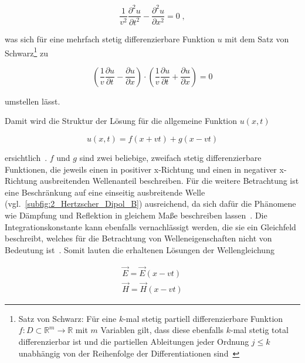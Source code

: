 \begin{equation}
    \frac{1}{v^2}\frac{\partial^2 u}{\partial t^2} - \frac{\partial^2 u}{\partial x^2} = 0 \; ,
\end{equation}

was sich für eine mehrfach stetig differenzierbare Funktion $u$ mit dem Satz von Schwarz\footnote{Satz von Schwarz: Für eine $k$-mal stetig partiell differenzierbare Funktion $f : D \subset \mathbb{R}^m \to \mathbb{R}$ mit $m$ Variablen gilt, dass diese ebenfalls $k$-mal stetig total differenzierbar ist und die partiellen Ableitungen jeder Ordnung $j \leq k$ unabhängig von der Reihenfolge der Differentiationen sind~\cite{Vorlesung_Ingenieursmathematik}} zu

\begin{equation}
    \left(\frac{1}{v} \frac{\partial u}{\partial t} - \frac{\partial u}{\partial x}\right) \cdot \left(\frac{1}{v} \frac{\partial u}{\partial t} + \frac{\partial u}{\partial x}\right) = 0
\end{equation}

umstellen lässt. \par
Damit wird die Struktur der Lösung für die allgemeine Funktion $u(x,t)$ 

\begin{equation}
    u(x,t) = f(x+vt) + g(x-vt)
\end{equation}

ersichtlich~\cite{Methoden_physikalischer_Mathematik_Band_2}. $f$ und $g$ sind zwei beliebige, zweifach stetig differenzierbare Funktionen, die jeweils einen in positiver x-Richtung und einen in negativer x-Richtung ausbreitenden Wellenanteil beschreiben. Für die weitere Betrachtung ist eine Beschränkung auf eine einseitig ausbreitende Welle (vgl.~\Abb \ref{subfig:2_Hertzscher_Dipol_B}) ausreichend, da sich dafür die Phänomene wie Dämpfung und Reflektion in gleichem Maße beschreiben lassen~\cite{EM_Schirmung}. Die Integrationskonstante kann ebenfalls vernachlässigt werden, die sie ein Gleichfeld beschreibt, welches für die Betrachtung von Welleneigenschaften nicht von Bedeutung ist~\cite{EM_Schirmung}. Somit lauten die erhaltenen Lösungen der Wellengleichung

\begin{subequations}
    \begin{align}
        \vec E = \vec E(x-vt) \\
        \vec H = \vec H(x-vt)
    \end{align}
\end{subequations}

